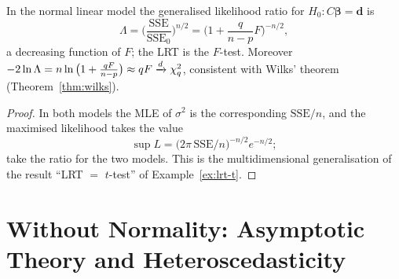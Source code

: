 \documentclass[main.tex]{subfiles}
\begin{document}
\begin{proposition}\label{prop:f-lrt}
In the normal linear model the generalised likelihood ratio for $H_0:C\bm\beta=\mathbf d$ is
\[
\Lambda=\Big(\frac{\mathrm{SSE}}{\mathrm{SSE}_0}\Big)^{n/2}=\Big(1+\frac{q}{n-p}F\Big)^{-n/2},
\]
a decreasing function of $F$; the LRT is the $F$-test. Moreover $-2\ln\Lambda=n\ln\big(1+\frac{qF}{n-p}\big)\approx qF\xrightarrow{d}\chi^2_q$, consistent with Wilks' theorem (Theorem~\ref{thm:wilks}).
\end{proposition}
\begin{proof}
In both models the MLE of $\sigma^2$ is the corresponding $\mathrm{SSE}/n$, and the maximised likelihood takes the value
\[
\sup L=\big(2\pi\,\mathrm{SSE}/n\big)^{-n/2}e^{-n/2} ;
\]
take the ratio for the two models. This is the multidimensional generalisation of the result ``LRT $=$ $t$-test'' of Example~\ref{ex:lrt-t}.
\end{proof}

\section{Without Normality: Asymptotic Theory and Heteroscedasticity}
\end{document}
